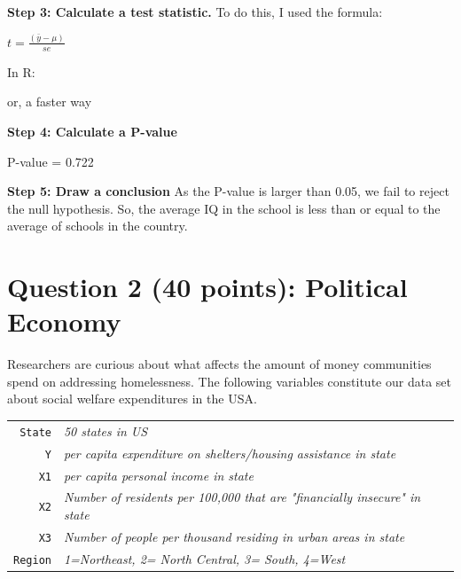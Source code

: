 \documentclass[12pt,letterpaper]{article}
\begin{document}
\begin{enumerate}
		\textbf{Step 3: Calculate a test statistic.}
		To do this, I used the formula:
	\begin{center}
		\large	$t=\frac{(\bar{y}-\mu)}{se}$
	\end{center}

		\normalsize In R:
		
		
		or, a faster way
	
		
		
		\textbf{Step 4: Calculate a P-value}
		
		
		
		P-value = 0.722
		
		\textbf{Step 5: Draw a conclusion}
		As the P-value is larger than 0.05, we fail to reject the null hypothesis. So, the average IQ in the school is less than or equal to the average of schools in the country.
		
		
		
\end{enumerate}

\newpage

	\section*{Question 2 (40 points): Political Economy}

\noindent Researchers are curious about what affects the amount of money communities spend on addressing homelessness. The following variables constitute our data set about social welfare expenditures in the USA. \\
\vspace{.5cm}


\begin{tabular}{r|l}
	\texttt{State} &\emph{50 states in US} \\
	\texttt{Y} & \emph{per capita expenditure on shelters/housing assistance in state}\\
	\texttt{X1} &\emph{per capita personal income in state} \\
	\texttt{X2} &  \emph{Number of residents per 100,000 that are "financially insecure" in state}\\
	\texttt{X3} &  \emph{Number of people per thousand residing in urban areas in state} \\
	\texttt{Region} &  \emph{1=Northeast, 2= North Central, 3= South, 4=West} \\
\end{tabular}
\end{document}
